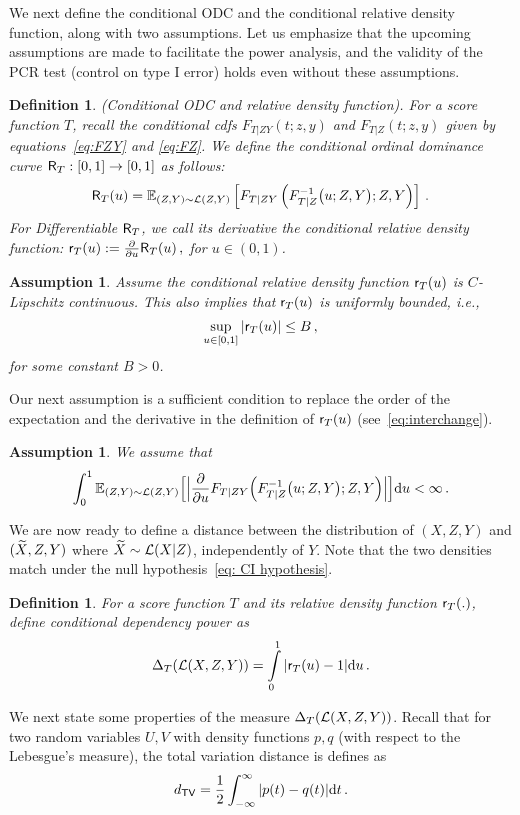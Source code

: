 \documentclass[11pt]{article}
\newtheorem{assumption}[propo]{Assumption}
\newtheorem{defi}[propo]{Definition}
\def\tv{\mathsf{TV}}
\begin{document}
We next define the conditional ODC and the conditional relative density function, along with two assumptions. Let us emphasize that the upcoming assumptions are made to facilitate the power analysis, and the validity of the PCR test (control on type I error) holds even without these assumptions. 
\begin{defi}\label{def: conditonal-odc}(Conditional ODC and relative density function). For a score function $T$, recall the conditional cdfs $F_{T|ZY}(t;z,y)$ and $F_{T|Z}(t;z,y)$ given by equations~\eqref{eq:FZY} and \eqref{eq:FZ}. We define the conditional ordinal dominance curve $\mathsf{R}_T:[0,1]\rightarrow [0,1]$ as follows:
	\[
	\mathsf{R}_{T}(u)={\mathbb E}_{(Z,Y) \sim \mathcal{L}(Z,Y)}\left[ F_{T|ZY}\left( F_{T|Z}^{-1}\big(u; Z,Y\big) ; Z,Y\right)  \right]\,.
	\]
	For Differentiable $\mathsf{R}_{T}$, we 
	 call its derivative the conditional relative density function:
	 $\mathsf{r}_{T}(u):=\frac{\partial}{\partial u}\mathsf{R}_{T}(u)\,,$ for $u\in (0,1)$.
	 	
\end{defi}

\begin{assumption}\label{assum: sr_continuity}
	Assume the conditional relative density function $\mathsf{r}_{T}(u)$ is  $C$-Lipschitz continuous. This also implies that $\mathsf{r}_{T}(u)$ is uniformly bounded, i.e.,
	\[\sup\limits_{u \in [0,1]} ^{} |\mathsf{r}_{T}(u)| \leq B\,,\]
	for some constant $B>0$.
	\end{assumption}
	
Our next assumption is a sufficient condition to replace the order of the expectation and the derivative in the definition of $\mathsf{r}_{T}(u)$ (see~\eqref{eq:interchange}). 
\begin{assumption}\label{assum: dR-L1-integrable}
We assume that
\[
\int_0^1 {\mathbb E}_{(Z,Y) \sim \mathcal{L}(Z,Y)}\Big[ \Big|\frac{\partial}{\partial u}F_{T|ZY}\Big( F_{T|Z}^{-1}\big(u; Z,Y\big) ; Z,Y\Big)  \Big|  \Big] {\rm d} u <\infty \,.
\]
\end{assumption}

We are now ready to define a distance between the distribution of $(X,Z,Y)$ and $({\widetilde{X}},Z,Y)$ where ${\widetilde{X}}\sim\mathcal{L}(X|Z)$, independently of $Y$. Note that the two densities match under the null hypothesis~\eqref{eq: CI hypothesis}. 


\begin{defi}\label{def: conditional-dependency-power}
	For a score function $T$ and its relative density function $\mathsf{r}_{T}(.)$, define \textit{conditional dependency power}  as 
	\[
	\Delta_T(\mathcal{L}(X,Z,Y))=\int\limits_{0}^{1}|\mathsf{r}_{T}(u)-1|{\rm d} u\,.
	\]
\end{defi}	
%
	We next state some properties of the measure $\Delta_T(\mathcal{L}(X,Z,Y))$. Recall that for two random variables $U, V$ with density functions $p, q$ (with respect to the Lebesgue's measure), the total variation distance is defines as
	\[
	d_{\tv} = \frac{1}{2}\int_{-\infty}^\infty |p(t) - q(t)|\de t\,.
	\]
	
\end{document}
